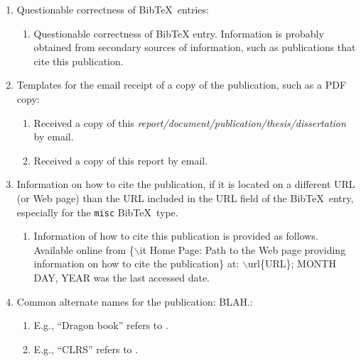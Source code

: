 \documentclass[letter,12pt]{article}
\begin{document}
\begin{enumerate}
\begin{enumerate}
		\begin{enumerate} \itemsep -2pt
		\item Differences between multiple publications are listed as follows. PUBLICATION1 addresses XYZ, but PUBLICATION2 and PUBLICATION3 do not.
		\end{enumerate}
	\end{enumerate}
\item Questionable correctness of {\sc Bib}\TeX\ entries: \vspace{-0.3cm}
	\begin{enumerate} \itemsep -2pt
	\item Questionable correctness of BibTeX entry. Information is probably obtained from secondary sources of information, such as publications that cite this publication.
	\end{enumerate}
\item Templates for the email receipt of a copy of the publication, such as a PDF copy: \vspace{-0.3cm}
	\begin{enumerate} \itemsep -2pt
	\item Received a copy of this {\it report/document/publication/thesis/dissertation} by email.
	\item Received a copy of this report by email.
	\end{enumerate}
\item Information on how to cite the publication, if it is located on a different URL (or Web page) than the URL included in the URL field of the {\sc Bib}\TeX\ entry, especially for the {\tt misc} {\sc Bib}\TeX\ type. \vspace{-0.3cm}
	\begin{enumerate} \itemsep -2pt
	\item Information of how to cite this publication is provided as follows. Available online from \{$\backslash$it Home Page: Path to the Web page providing information on how to cite the publication\} at: $\backslash$url\{URL\}; MONTH DAY, YEAR was the last accessed date.
	\end{enumerate}
\item Common alternate names for the publication: BLAH.: \vspace{-0.3cm}
	\begin{enumerate} \itemsep -2pt
	\item E.g., ``Dragon book'' \cite{WikipediaContributors2021f} refers to \cite{Aho2007,Aho1986}.
	\item E.g., ``CLRS'' \cite{WikipediaContributors2022d} refers to \cite{Cormen2022,Cormen2009,Cormen2001}.

\end{enumerate}
\end{enumerate}
\end{document}
